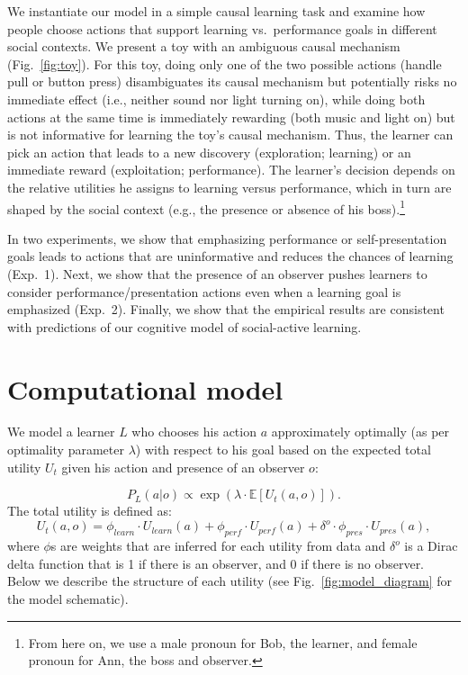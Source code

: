 \documentclass[10pt, letterpaper]{article}
\begin{document}
We instantiate our model in a simple causal learning task and examine
how people choose actions that support learning vs.~performance goals in
different social contexts. We present a toy with an ambiguous causal
mechanism (Fig.~\ref{fig:toy}). For this toy, doing only one of the two
possible actions (handle pull or button press) disambiguates its causal
mechanism but potentially risks no immediate effect (i.e., neither sound
nor light turning on), while doing both actions at the same time is
immediately rewarding (both music and light on) but is not informative
for learning the toy's causal mechanism. Thus, the learner can pick an
action that leads to a new discovery (exploration; learning) or an
immediate reward (exploitation; performance). The learner's decision
depends on the relative utilities he assigns to learning versus
performance, which in turn are shaped by the social context (e.g., the
presence or absence of his
boss).\footnote{From here on, we use a male pronoun for Bob, the learner, and female pronoun for Ann, the boss and observer.}

In two experiments, we show that emphasizing performance or
self-presentation goals leads to actions that are uninformative and
reduces the chances of learning (Exp.~1). Next, we show that the
presence of an observer pushes learners to consider
performance/presentation actions even when a learning goal is emphasized
(Exp.~2). Finally, we show that the empirical results are consistent
with predictions of our cognitive model of social-active learning.

\hypertarget{computational-model}{%
\section{Computational model}\label{computational-model}}

We model a learner \(L\) who chooses his action \(a\) approximately
optimally (as per optimality parameter \(\lambda\)) with respect to his
goal based on the expected total utility \(U_{t}\) given his action and
presence of an observer \(o\):

\[ P_L(a | o) \propto \exp(\lambda \cdot \mathbb{E}[U_{t}(a,o)]).\]
\noindent The total utility is defined as:
\[U_{t}(a,o) = \phi_{learn} \cdot U_{learn}(a) + \phi_{perf} \cdot U_{perf}(a) + \delta^o \cdot \phi_{pres} \cdot U_{pres}(a),\]
\noindent where \(\phi\)s are weights that are inferred for each utility
from data and \(\delta^o\) is a Dirac delta function that is 1 if there
is an observer, and 0 if there is no observer. Below we describe the
structure of each utility (see Fig.~\ref{fig:model_diagram} for the
model schematic).
\end{document}
